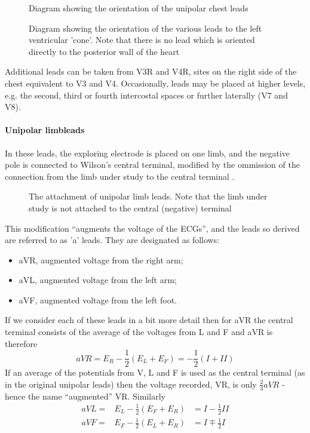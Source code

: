 \begin{figure}[htbp] \centering
  \caption{Diagram showing the orientation of the unipolar chest leads}
  \label{fig:v1-v6}
\end{figure}

\begin{figure}[htbp] \centering
  \caption{Diagram showing the orientation of the various leads to the left
    ventricular 'cone'.  Note that there is no lead which is oriented
    directly to the posterior wall of the heart}
  \label{fig:v1-v6-b}
\end{figure}

Additional leads can be taken from V3R and V4R, sites on the right side of
the chest equivalent to V3 and V4.  Occasionally, leads may be placed at
higher levels, e.g. the second, third or fourth intercostal spaces or
further laterally (V7 and V8).

\paragraph{Unipolar limbleads}
In these leads, the exploring electrode is placed on one limb, and the
negative pole is connected to Wilson's central terminal, modified by the
ommission of the connection from the limb under study to the central terminal
.

\begin{figure}[htbp] \centering
  \caption{The attachment of unipolar limb leads.  Note that the limb under
    study is not attached to the central (negative) terminal}
  \label{fig:ecg-leads}
\end{figure}

This modification ``augments the voltage of the ECGs'', and the leads so derived
are referred to as 'a' leads. They are designated as follows:
\begin{itemize}
\item aVR, augmented voltage from the right arm;
\item aVL, augmented voltage from the left arm;
\item aVF, augmented voltage from the left foot.
\end{itemize}
If we consider each of these leads in a bit more detail then for aVR the
central terminal consists of the average of the voltages from L and F and aVR
is therefore
\begin{displaymath}
  aVR = E_{R} -\frac{1}{2} (E_{L} + E_{F} ) = -\frac{1}{2}(I + II)
\end{displaymath}
If an average of the potentials from V, L and F is used as the central
terminal (as in the original unipolar leads) then the voltage recorded, VR,
is only  $\frac{2}{3}aVR$ - hence the name ``augmented'' VR.
Similarly
\begin{eqnarray*}
  aVL = & E_{L} - \frac{1}{2} (E_{F} + E_{R}) & = I - \frac{1}{2} II\\
  aVF = & E_{F} - \frac{1}{2} (E_{L} + E_{R}) & = I \mp \frac{1}{2} I
\end{eqnarray*}
  
